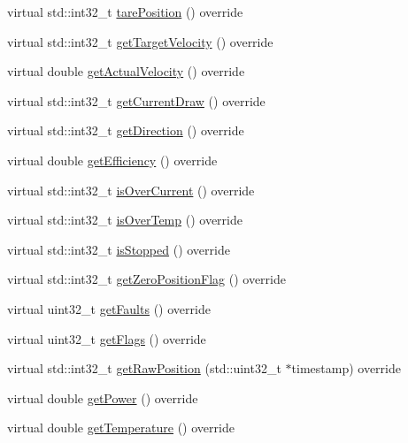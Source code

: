 \begin{DoxyCompactItemize}
\item 
virtual std\+::int32\+\_\+t \mbox{\hyperlink{classokapi_1_1Motor_aa71f3d93b734caec5c9245b211d4a0ad}{tare\+Position}} () override
\item 
virtual std\+::int32\+\_\+t \mbox{\hyperlink{classokapi_1_1Motor_aee4697f4e1f39bc0206062d0247caf47}{get\+Target\+Velocity}} () override
\item 
virtual double \mbox{\hyperlink{classokapi_1_1Motor_a12dab94ff8e0636c01d3c568d9461655}{get\+Actual\+Velocity}} () override
\item 
virtual std\+::int32\+\_\+t \mbox{\hyperlink{classokapi_1_1Motor_ac5107f8aef228d4b4fec06d549c55cf6}{get\+Current\+Draw}} () override
\item 
virtual std\+::int32\+\_\+t \mbox{\hyperlink{classokapi_1_1Motor_a72c69d60e2ec69c126c84dc81f78742d}{get\+Direction}} () override
\item 
virtual double \mbox{\hyperlink{classokapi_1_1Motor_a7703340c95e9e7dcafa243685a7d2d50}{get\+Efficiency}} () override
\item 
virtual std\+::int32\+\_\+t \mbox{\hyperlink{classokapi_1_1Motor_aff882cb26c477355551d7bbf8e5c03bb}{is\+Over\+Current}} () override
\item 
virtual std\+::int32\+\_\+t \mbox{\hyperlink{classokapi_1_1Motor_a8a51f7dede42f768280b73d85a528d91}{is\+Over\+Temp}} () override
\item 
virtual std\+::int32\+\_\+t \mbox{\hyperlink{classokapi_1_1Motor_ab4edaf8e4ed576fa2003d4cc8e02c364}{is\+Stopped}} () override
\item 
virtual std\+::int32\+\_\+t \mbox{\hyperlink{classokapi_1_1Motor_a2640dea57e59a19aa6000da2c7cefdeb}{get\+Zero\+Position\+Flag}} () override
\item 
virtual uint32\+\_\+t \mbox{\hyperlink{classokapi_1_1Motor_a7d16e9d0a3319a02a12476b5bec991d7}{get\+Faults}} () override
\item 
virtual uint32\+\_\+t \mbox{\hyperlink{classokapi_1_1Motor_acb0097ba7ac778674efaa2c0765f6f3f}{get\+Flags}} () override
\item 
virtual std\+::int32\+\_\+t \mbox{\hyperlink{classokapi_1_1Motor_a74c579c35863bc5180c9551fd5185d94}{get\+Raw\+Position}} (std\+::uint32\+\_\+t $\ast$timestamp) override
\item 
virtual double \mbox{\hyperlink{classokapi_1_1Motor_a992171c86829e52f5418988fada0b6fa}{get\+Power}} () override
\item 
virtual double \mbox{\hyperlink{classokapi_1_1Motor_ab5b9208b001c1ab49f8c058eff58e5b3}{get\+Temperature}} () override

\end{DoxyCompactItemize}
